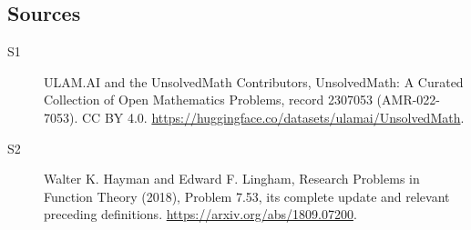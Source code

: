 \documentclass[11pt]{article}
\begin{document}
\subsection{Sources}
\begin{description}
\item[\hypertarget{source:2307053:1}{S1}] ULAM.AI and the UnsolvedMath Contributors, UnsolvedMath: A Curated Collection of Open Mathematics Problems, record 2307053 (AMR-022-7053). CC BY 4.0. \url{https://huggingface.co/datasets/ulamai/UnsolvedMath}.
\item[\hypertarget{source:2307053:2}{S2}] Walter K. Hayman and Edward F. Lingham, Research Problems in Function Theory (2018), Problem 7.53, its complete update and relevant preceding definitions. \url{https://arxiv.org/abs/1809.07200}.
\end{description}
\label{end:2307053}
\end{document}
